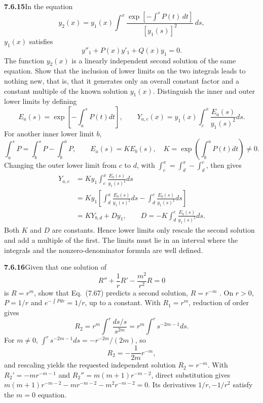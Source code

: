 \par\bigskip
\noindent\textbf{7.6.15}\quad In the equation
\[
y_{2}(x)=y_{1}(x)\int^{x}\frac{\exp\left[-\int^{s}P(t)\,dt\right]}
{[y_{1}(s)]^{2}}\,ds,
\]
$y_{1}(x)$ satisfies
\[
y''_{1}+P(x)y'_{1}+Q(x)y_{1}=0.
\]
The function $y_{2}(x)$ is a linearly independent second solution of the same
equation. Show that the inclusion of lower limits on the two integrals leads
to nothing new, that is, that it generates only an overall constant factor and
a constant multiple of the known solution $y_{1}(x)$.
\solution
Distinguish the inner and outer lower limits by defining
\[
E_a(s)=\exp\left[-\int_a^sP(t)dt\right],\qquad
Y_{a,c}(x)=y_1(x)\int_c^x\frac{E_a(s)}{y_1(s)^2}ds.
\]
For another inner lower limit $b$,
\[
\int_a^sP=\int_b^sP-\int_b^aP,\qquad
E_a(s)=K E_b(s),\quad K=\exp\left(\int_b^aP(t)dt\right)\ne0.
\]
Changing the outer lower limit from $c$ to $d$, with
$\int_c^x=\int_d^x-\int_d^c$, then gives
\begin{align*}
Y_{a,c}
&=K y_1\int_c^x\frac{E_b(s)}{y_1(s)^2}ds\\
&=K y_1\left[\int_d^x\frac{E_b(s)}{y_1(s)^2}ds
              -\int_d^c\frac{E_b(s)}{y_1(s)^2}ds\right]\\
&=\boxed{K Y_{b,d}+D y_1},\qquad
D=-K\int_d^c\frac{E_b(s)}{y_1(s)^2}ds.
\end{align*}
Both $K$ and $D$ are constants. Hence lower limits only rescale the
second solution and add a multiple of the first. The limits must lie in
an interval where the integrals and the nonzero-denominator formula are
well defined.

\par\bigskip
\noindent\textbf{7.6.16}\quad Given that one solution of
\[
R''+\frac{1}{r}R'-\frac{m^{2}}{r^{2}}R=0
\]
is $R=r^{m}$, show that Eq.~(7.67) predicts a second solution,
$R=r^{-m}$ .
\solution
On $r>0$, $P=1/r$ and $e^{-\int Pdr}=1/r$, up to a constant.
With $R_1=r^m$, reduction of order gives
\[
R_2=r^m\int^r\frac{ds/s}{s^{2m}}
=r^m\int^rs^{-2m-1}ds.
\]
For $m\ne0$, $\int^rs^{-2m-1}ds=-r^{-2m}/(2m)$, so
\[
R_2=-\frac1{2m}r^{-m},
\]
and rescaling yields the requested independent solution
$\boxed{R_2=r^{-m}}$. With $R_2'=-mr^{-m-1}$ and
$R_2''=m(m+1)r^{-m-2}$, direct substitution gives
$m(m+1)r^{-m-2}-mr^{-m-2}-m^2r^{-m-2}=0$.
 Its derivatives $1/r,-1/r^2$ satisfy the $m=0$ equation.

